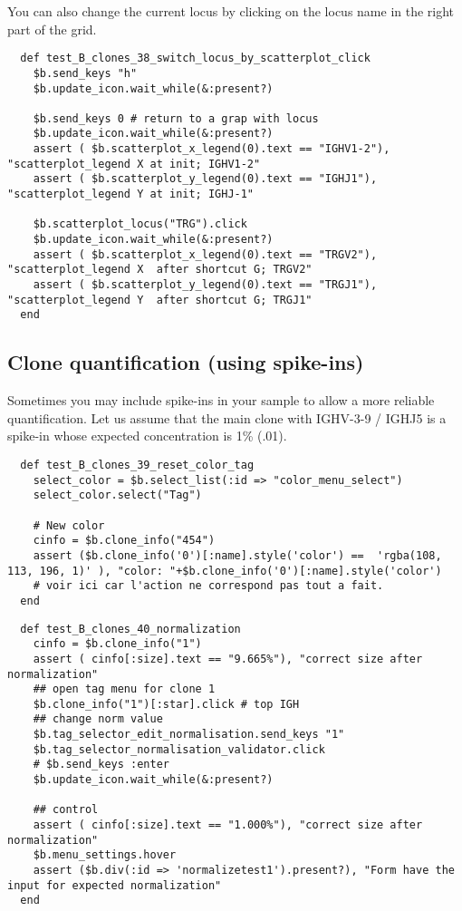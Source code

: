 You can also change the current locus by clicking on the locus name in the
right part of the grid.
\begin{verbatim}
  def test_B_clones_38_switch_locus_by_scatterplot_click
    $b.send_keys "h"
    $b.update_icon.wait_while(&:present?)
    
    $b.send_keys 0 # return to a grap with locus 
    $b.update_icon.wait_while(&:present?)
    assert ( $b.scatterplot_x_legend(0).text == "IGHV1-2"), "scatterplot_legend X at init; IGHV1-2"
    assert ( $b.scatterplot_y_legend(0).text == "IGHJ1"), "scatterplot_legend Y at init; IGHJ-1"

    $b.scatterplot_locus("TRG").click
    $b.update_icon.wait_while(&:present?)
    assert ( $b.scatterplot_x_legend(0).text == "TRGV2"), "scatterplot_legend X  after shortcut G; TRGV2"
    assert ( $b.scatterplot_y_legend(0).text == "TRGJ1"), "scatterplot_legend Y  after shortcut G; TRGJ1"  
  end
\end{verbatim}

\subsection{Clone quantification (using spike-ins)}

Sometimes you may include spike-ins in your sample to allow a more reliable
quantification.
Let us assume that the main clone with IGHV-3-9 / IGHJ5 is a spike-in whose
expected concentration is 1\% (.01).

\begin{verbatim}
  def test_B_clones_39_reset_color_tag
    select_color = $b.select_list(:id => "color_menu_select")
    select_color.select("Tag")

    # New color
    cinfo = $b.clone_info("454")
    assert ($b.clone_info('0')[:name].style('color') ==  'rgba(108, 113, 196, 1)' ), "color: "+$b.clone_info('0')[:name].style('color')
    # voir ici car l'action ne correspond pas tout a fait.
  end
\end{verbatim}

\begin{verbatim}
  def test_B_clones_40_normalization
    cinfo = $b.clone_info("1")
    assert ( cinfo[:size].text == "9.665%"), "correct size after normalization"
    ## open tag menu for clone 1
    $b.clone_info("1")[:star].click # top IGH
    ## change norm value
    $b.tag_selector_edit_normalisation.send_keys "1"
    $b.tag_selector_normalisation_validator.click
    # $b.send_keys :enter
    $b.update_icon.wait_while(&:present?)

    ## control
    assert ( cinfo[:size].text == "1.000%"), "correct size after normalization"
    $b.menu_settings.hover
    assert ($b.div(:id => 'normalizetest1').present?), "Form have the input for expected normalization"
  end
\end{verbatim}

